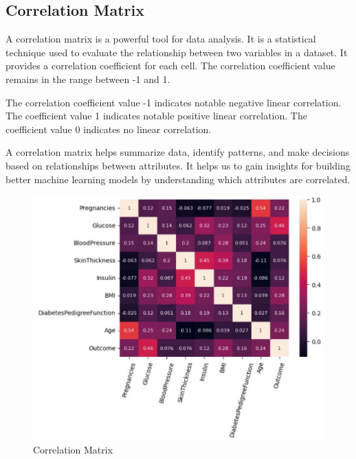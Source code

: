 \subsection{Correlation Matrix}
\label{subsec:corr_matrix}
A correlation matrix is a powerful tool for data analysis. It is a statistical technique used to evaluate the relationship between two variables in a dataset. It provides a correlation coefficient for each cell. The correlation coefficient value remains in the range between -1 and 1.

The correlation coefficient value -1 indicates notable negative linear correlation. The coefficient value 1 indicates notable positive linear correlation. The coefficient value 0 indicates no linear correlation.

A correlation matrix helps summarize data, identify patterns, and make decisions based on relationships between attributes. It helps us to gain insights for building better machine learning models by understanding which attributes are correlated.

\begin{figure}[ht]
    \centering    \includegraphics[scale=0.8]{figures/data_correlation.pdf}
    \caption{Correlation Matrix}
    \label{fig:capture_c}
\end{figure}

